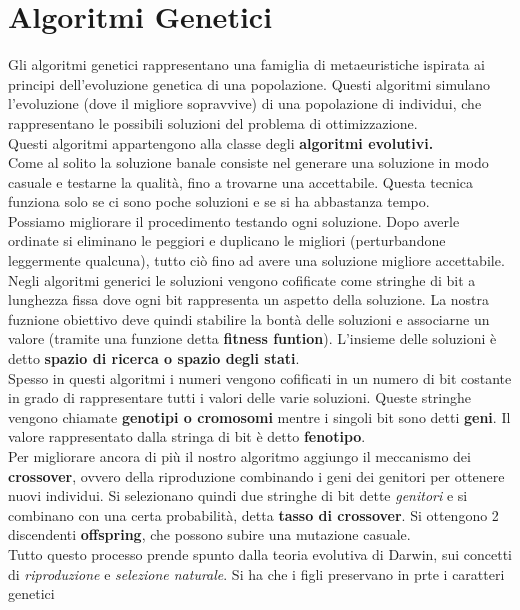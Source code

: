 \documentclass[a4paper,12pt, oneside]{book}
\begin{document}
\section{Algoritmi Genetici}
Gli algoritmi genetici rappresentano una famiglia di metaeuristiche
ispirata ai principi dell'evoluzione genetica di una
popolazione. Questi algoritmi simulano l'evoluzione (dove il migliore
sopravvive) di una popolazione di individui, che rappresentano le
possibili soluzioni del problema di ottimizzazione.\\
Questi algoritmi appartengono alla classe degli \textbf{algoritmi
  evolutivi.}\\
Come al solito la soluzione banale consiste nel generare una soluzione
in modo casuale e testarne la qualità, fino a trovarne una
accettabile. Questa tecnica funziona solo se ci sono poche soluzioni e
se si ha abbastanza tempo.\\
Possiamo migliorare il procedimento testando ogni soluzione. Dopo
averle ordinate si eliminano le peggiori e duplicano le migliori
(perturbandone leggermente qualcuna), tutto ciò fino ad avere una
soluzione migliore accettabile.\\
Negli algoritmi generici le soluzioni vengono cofificate come stringhe
di bit a lunghezza fissa dove ogni bit rappresenta un aspetto della
soluzione. La nostra fuznione obiettivo deve quindi stabilire la bontà
delle soluzioni e associarne un valore (tramite una funzione detta
\textbf{fitness funtion}). L'insieme delle soluzioni è
detto \textbf{spazio di ricerca o spazio degli stati}.\\
Spesso in questi algoritmi i numeri vengono cofificati in un numero di
bit costante in grado di rappresentare tutti i valori delle varie
soluzioni. Queste stringhe vengono chiamate \textbf{genotipi o
  cromosomi} mentre i singoli bit sono detti \textbf{geni}. Il valore
rappresentato dalla stringa di bit è detto \textbf{fenotipo}.\\
Per migliorare ancora di più il nostro algoritmo aggiungo il
meccanismo dei \textbf{crossover}, ovvero della riproduzione
combinando i geni dei genitori per ottenere nuovi individui. Si
selezionano quindi due stringhe di bit dette \textit{genitori} e si
combinano con una certa probabilità, detta \textbf{tasso di
  crossover}. Si ottengono 2 discendenti \textbf{offspring}, che
possono subire una mutazione casuale.\\
Tutto questo processo prende spunto dalla teoria evolutiva di Darwin,
sui concetti di \textit{riproduzione} e \textit{selezione
  naturale}. Si ha che i figli preservano in prte i caratteri genetici
\end{document}
